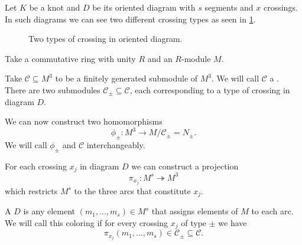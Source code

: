 Let $K$ be a knot and $D$ be its oriented diagram with $s$ segments and $x$ crossings. In such diagrams we can see two different crossing types as seen in \cref{crossing_type}. 
\begin{figure}[h]\centering
  \caption{Two types of crossing in oriented diagram.\label{crossing_type}}
\end{figure}

Take a commutative ring with unity $R$ and an $R$-module $M$.

\begin{definition}
  Take $\mathcal{C}\subseteq M^3$ to be a finitely generated submodule of $M^3$. We will call $\mathcal{C}$ a . There are two submodules $\mathcal{C}_\pm\subseteq \mathcal{C}$, each corresponding to a type of crossing in diagram $D$. 
\end{definition}

We can now construct two homomorphisms
$$\phi_\pm:M^3\to M/\mathcal{C}_\pm=N_\pm.$$
We will call $\phi_\pm$ and $\mathcal{C}$  interchangeably.



For each crossing $x_j$ in diagram $D$ we can construct a projection 
$$\pi_{x_j}:M^s\twoheadrightarrow M^3$$
which restricts $M^s$ to the three arcs that constitute $x_j$.

\begin{definition}
  A  $D$ is any element $(m_1,..., m_s)\in M^s$ that assigns elements of $M$ to each arc. We will call this coloring  if for every crossing $x_j$ of type $\pm$ we have 
  $$\pi_{x_j}(m_1,..., m_s)\in \mathcal{C}_\pm\subseteq\mathcal{C}.$$
\end{definition}

